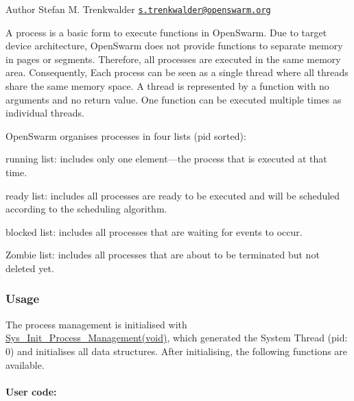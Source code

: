 \begin{DoxyAuthor}{Author}
Stefan M. Trenkwalder \href{mailto:s.trenkwalder@openswarm.org}{\tt s.\+trenkwalder@openswarm.\+org}
\end{DoxyAuthor}
A process is a basic form to execute functions in Open\+Swarm. Due to target device architecture, Open\+Swarm does not provide functions to separate memory in pages or segments. Therefore, all processes are executed in the same memory area. Consequently, Each process can be seen as a single thread where all threads share the same memory space. A thread is represented by a function with no arguments and no return value. One function can be executed multiple times as individual threads.

Open\+Swarm organises processes in four lists (pid sorted)\+:
\begin{DoxyEnumerate}
\item running list\+: includes only one element---the process that is executed at that time.
\item ready list\+: includes all processes are ready to be executed and will be scheduled according to the scheduling algorithm.
\item blocked list\+: includes all processes that are waiting for events to occur.
\item Zombie list\+: includes all processes that are about to be terminated but not deleted yet.
\end{DoxyEnumerate}\hypertarget{group__process_process_usage}{}\subsubsection{Usage}\label{group__process_process_usage}
The process management is initialised with \hyperlink{process__Management_8h_ae2b7783ff0eedf8b5cc0fbe90ffc6a6b}{Sys\+\_\+\+Init\+\_\+\+Process\+\_\+\+Management(void)}, which generated the System Thread (pid\+: 0) and initialises all data structures. After initialising, the following functions are available. \hypertarget{group__process_process_usercode}{}\paragraph{User code\+:}\label{group__process_process_usercode}

